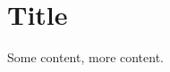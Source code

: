 \documentclass[]{article}
\begin{document}
	
\begin{comment}
I like to start with a block comment outline of what I will write about
\end{comment}
	
	
\section*{Title}
Some content, more content.

\end{document}
